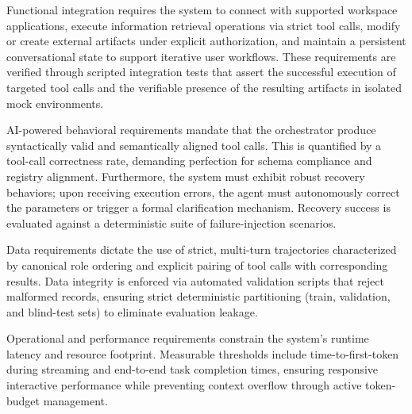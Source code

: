 \documentclass[conference]{IEEEtran}
\begin{document}
Functional integration requires the system to connect with supported workspace applications, execute information retrieval operations via strict tool calls, modify or create external artifacts under explicit authorization, and maintain a persistent conversational state to support iterative user workflows. These requirements are verified through scripted integration tests that assert the successful execution of targeted tool calls and the verifiable presence of the resulting artifacts in isolated mock environments.

AI-powered behavioral requirements mandate that the orchestrator produce syntactically valid and semantically aligned tool calls. This is quantified by a tool-call correctness rate, demanding perfection for schema compliance and registry alignment. Furthermore, the system must exhibit robust recovery behaviors; upon receiving execution errors, the agent must autonomously correct the parameters or trigger a formal clarification mechanism. Recovery success is evaluated against a deterministic suite of failure-injection scenarios.

Data requirements dictate the use of strict, multi-turn trajectories characterized by canonical role ordering and explicit pairing of tool calls with corresponding results. Data integrity is enforced via automated validation scripts that reject malformed records, ensuring strict deterministic partitioning (train, validation, and blind-test sets) to eliminate evaluation leakage.

Operational and performance requirements constrain the system's runtime latency and resource footprint. Measurable thresholds include time-to-first-token during streaming and end-to-end task completion times, ensuring responsive interactive performance while preventing context overflow through active token-budget management.
\end{document}
